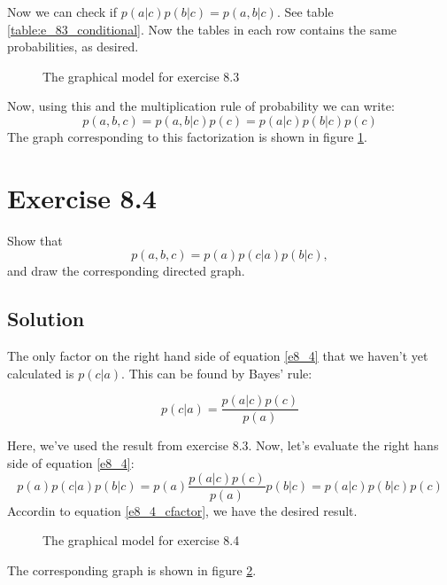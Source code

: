 \documentclass[12pt, a4paper]{article}
\numberwithin{equation}{section}
\begin{document}
Now we can check if $p(a|c)p(b|c)=p(a,b|c)$. See table \ref{table:e_83_conditional}. Now the tables in each row contains the same probabilities, as desired.

\begin{figure}
\centering
{}
\caption{The graphical model for exercise 8.3}
\label{graph:e8_3}
\end{figure}

Now, using this and the multiplication rule of probability we can write:
\begin{equation}
p(a,b,c)=p(a,b|c)p(c)=p(a|c)p(b|c)p(c)
\label{e8_4_cfactor}
\end{equation}
The graph corresponding to this factorization is shown in figure \ref{graph:e8_3}.

\section{Exercise 8.4}
Show that
\begin{equation}
p(a,b,c)=p(a)p(c|a)p(b|c),
\label{e8_4}
\end{equation}
and draw the corresponding directed graph.

\subsection{Solution}
The only factor on the right hand side of equation \ref{e8_4} that we haven't yet calculated is $p(c|a)$. This can be found by Bayes' rule:

\begin{equation}
p(c|a)=\frac{p(a|c)p(c)}{p(a)}
\end{equation}

Here, we've used the result from exercise 8.3.
Now, let's evaluate the right hans side of equation \ref{e8_4}:
\begin{equation}
p(a)p(c|a)p(b|c)=p(a)\frac{p(a|c)p(c)}{p(a)}p(b|c)=p(a|c)p(b|c)p(c)
\end{equation}
Accordin to equation \ref{e8_4_cfactor}, we have the desired result.

\begin{figure}
\centering
{}
\caption{The graphical model for exercise 8.4}
\label{graph:e8_4}
\end{figure}

The corresponding graph is shown in figure \ref{graph:e8_4}.
\end{document}
